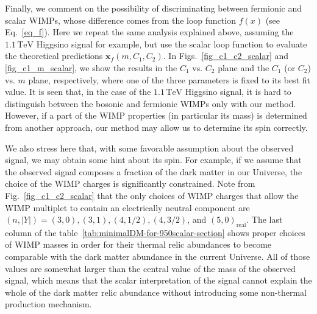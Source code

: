 \documentclass[12pt,twoside,book]{article}
\begin{document}
Finally, we comment on the possibility of discriminating between fermionic and scalar WIMPs, whose difference comes from the loop function $f(x)$ (see Eq.~\eqref{eq_f}).
Here we repeat the same analysis explained above, assuming the $1.1\,\mathrm{TeV}$ Higgsino signal for example, but use the scalar loop function to evaluate the theoretical predictions $\bm{x}_f (m, C_1, C_2)$.
In Figs.~\ref{fig_c1_c2_scalar} and \ref{fig_c1_m_scalar}, we show the results in the $C_1$ vs. $C_2$ plane and the $C_1$ (or $C_2$) vs. $m$ plane, respectively, where one of the three parameters is fixed to its best fit value.
It is seen that, in the case of the $1.1\,\mathrm{TeV}$ Higgsino signal, it is hard to distinguish between the bosonic and fermionic WIMPs only with our method.
However, if a part of the WIMP properties (in particular its mass) is determined from another approach, our method may allow us to determine its spin correctly.

We also stress here that, with some favorable assumption about the observed signal, we may obtain some hint about its spin.
For example, if we assume that the observed signal composes a fraction of the dark matter in our Universe, the choice of the WIMP charges is significantly constrained.
Note from Fig.~\ref{fig_c1_c2_scalar} that the only choices of WIMP charges that allow the WIMP multiplet to contain an electrically neutral component are $(n,|Y|)=(3,0),(3,1),(4,1/2),(4,3/2)$, and $(5,0)_\text{real}$.
The last column of the table~\ref{tab:minimalDM-for-950scalar-section} shows proper choices of WIMP masses in order for their thermal relic abundances to become comparable with the dark matter abundance in the current Universe.
All of those values are somewhat larger than the central value of the mass of the observed signal, which means that the scalar interpretation of the signal cannot explain the whole of the dark matter relic abundance without introducing some non-thermal production mechanism.
\end{document}
